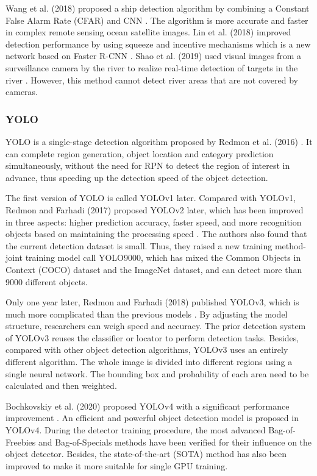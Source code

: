 \documentclass[sensors,article,submit,moreauthors,pdftex]{Definitions/mdpi}
\begin{document}
Wang et al. (2018) proposed a ship detection algorithm by combining a Constant False Alarm Rate (CFAR) and CNN \cite {wang2018study}. The algorithm is more accurate and faster in complex remote sensing ocean satellite images. Lin et al. (2018) improved detection performance by using squeeze and incentive mechanisms which is a new network based on Faster R-CNN \cite {lin2018squeeze}. Shao et al. (2019) used visual images from a surveillance camera by the river to realize real-time detection of targets in the river \cite {shao2019saliency}. However, this method cannot detect river areas that are not covered by cameras.


\subsubsection{YOLO}
YOLO is a single-stage detection algorithm proposed by Redmon et al. (2016) \cite{redmon2016you}. It can complete region generation, object location and category prediction simultaneously, without the need for RPN to detect the region of interest in advance, thus speeding up the detection speed of the object detection.

The first version of YOLO is called YOLOv1 later. Compared with YOLOv1, Redmon and Farhadi (2017) proposed YOLOv2 later, which has been improved in three aspects: higher prediction accuracy, faster speed, and more recognition objects based on maintaining the processing speed \cite{redmon2017yolo9000}.
The authors also found that the current detection dataset is small. Thus, they raised a new training method-joint training model call YOLO9000, which has mixed the Common Objects in Context (COCO) dataset and the ImageNet dataset, and can detect more than 9000 different objects.


Only one year later, Redmon and Farhadi (2018) published YOLOv3, which is much more complicated than the previous models \cite{redmon2018yolov3}. By adjusting the model structure, researchers can weigh speed and accuracy. The prior detection system of YOLOv3 reuses the classifier or locator to perform detection tasks. Besides, compared with other object detection algorithms, YOLOv3 uses an entirely different algorithm. The whole image is divided into different regions using a single neural network. The bounding box and probability of each area need to be calculated and then weighted.

Bochkovskiy et al. (2020)  proposed YOLOv4 with a significant performance improvement \cite{bochkovskiy2020yolov4}. An efficient and powerful object detection model is proposed in YOLOv4. During the detector training procedure, the most advanced Bag-of-Freebies and Bag-of-Specials methods have been verified for their influence on the object detector. Besides, the state-of-the-art (SOTA) method has also been improved to make it more suitable for single GPU training.
\end{document}
